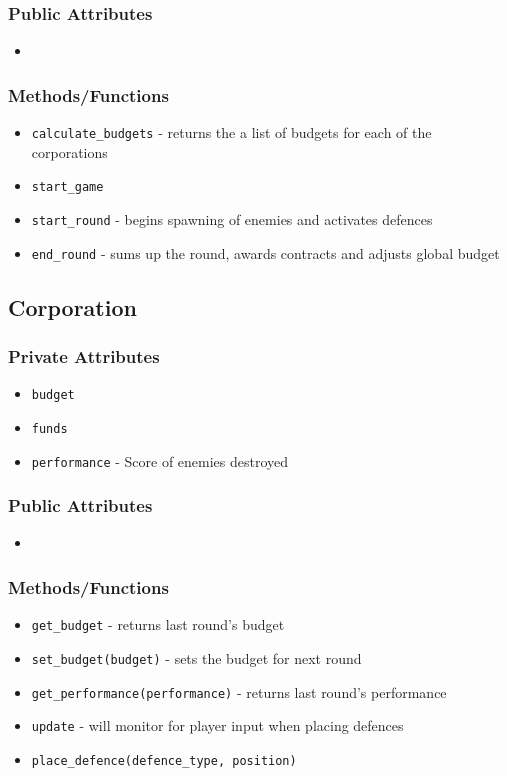 \documentclass[12pt]{article}
\begin{document}
\subsubsection*{Public Attributes}
\begin{itemize}
\item 
\end{itemize}
\subsubsection*{Methods/Functions}
\begin{itemize}
\item \texttt{calculate\_budgets} - returns the a list of budgets for each
of the corporations
\item \texttt{start\_game}
\item \texttt{start\_round} - begins spawning of enemies and activates defences
\item \texttt{end\_round} - sums up the round, awards contracts and adjusts
global budget
\end{itemize}



\subsection*{Corporation}
\subsubsection*{Private Attributes}
\begin{itemize}
\item \texttt{budget}
\item \texttt{funds}
\item \texttt{performance} - Score of enemies destroyed
\end{itemize}
\subsubsection*{Public Attributes}
\begin{itemize}
\item 
\end{itemize}
\subsubsection*{Methods/Functions}
\begin{itemize}
\item \texttt{get\_budget} - returns last round's budget
\item \texttt{set\_budget(budget)} - sets the budget for next round
\item \texttt{get\_performance(performance)} - returns last round's performance
\item \texttt{update} - will monitor for player input when placing defences
\item \texttt{place\_defence(defence\_type, position)}
\end{itemize}
\end{document}
